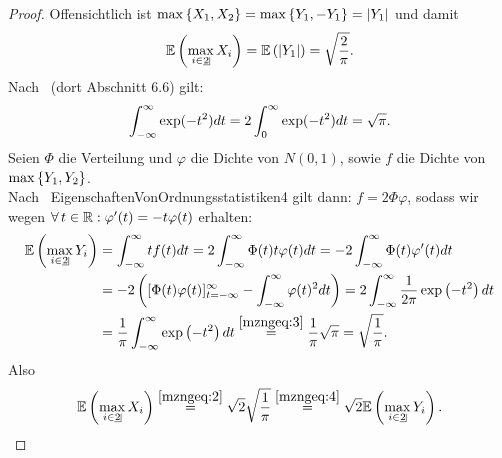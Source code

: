 \begin{proof}
Offensichtlich ist $\max\left\{X_1,X_2\right\} = \max\left\{Y_1, -Y_1\right\} = \left|Y_1\right|$
und damit
\begin{align}
\E\left(\max_{i \in \haken 2}X_i \right) = \E\left(\abs {Y_1} \right) 
= \sqrt{\frac 2 \pi}\label{mzngeq:2}\text.
\end{align}
Nach~\cite{K2} (dort Abschnitt 6.6) gilt:
\begin{align}
\int_{-\infty}^\infty \exp(-t^2)dt = 2 \int_0^\infty \exp(-t^2)dt = \sqrt \pi
\label{mzngeq:3}\text.
\end{align}
Seien $\Phi$ die Verteilung und $\varphi$ die Dichte von $N(0,1)$, sowie
$f$ die Dichte von $\max\left\{Y_1, Y_2\right\}$.\\
Nach~
{EigenschaftenVonOrdnungsstatistiken4} gilt dann: $f = 2\Phi\varphi$,
sodass wir wegen $\forall\, t \in \mathbb{R}: \varphi'(t) = -t\varphi(t)$ erhalten:
\begin{align}
\E\left(\max_{i \in \haken 2}Y_i \right)&=
\int_{-\infty}^\infty t f(t)dt = 2\int_{-\infty}^\infty \Phi(t)t\varphi(t)dt
= - 2\int_{-\infty}^\infty \Phi(t)\varphi'(t)dt\notag\\
&= -2\left([\Phi(t)\varphi(t)]_{t=-\infty}^\infty -
\int_{-\infty}^\infty \varphi(t)^2dt \right)
= 2 \int_{-\infty}^\infty \frac 1 {2\pi}\exp\left(-t^2\right)dt\notag\\
&= \frac 1 \pi \int_{-\infty}^\infty \exp\left(-t^2\right)dt
\overset{\eqref{mzngeq:3}}= \frac 1 \pi \sqrt \pi = \sqrt{\frac 1 \pi}\text.
\label{mzngeq:4}
\end{align}
Also
\[\E\left(\max_{i \in \haken 2}X_i \right) \overset{\eqref{mzngeq:2}}= 
\sqrt 2 \sqrt{\frac 1 \pi} \overset{\eqref{mzngeq:4}}= 
\sqrt 2 \E\left(\max_{i \in \haken 2}Y_i \right)\text. \qedhere\]
\end{proof}